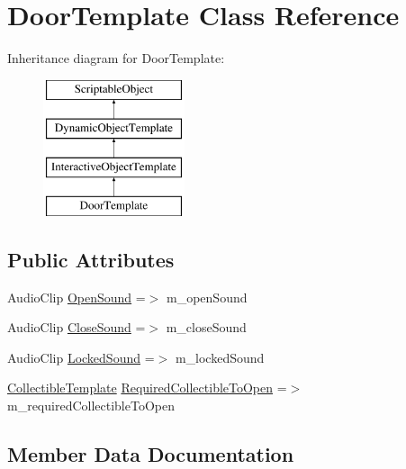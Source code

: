 \hypertarget{class_door_template}{}\section{Door\+Template Class Reference}
\label{class_door_template}
Inheritance diagram for Door\+Template\+:\begin{figure}[H]
\begin{center}
\leavevmode
\includegraphics[height=4.000000cm]{class_door_template}
\end{center}
\end{figure}
\subsection*{Public Attributes}
\begin{DoxyCompactItemize}
\item 
Audio\+Clip \mbox{\hyperlink{class_door_template_a0e5d35a1fd060d6b7708f4073b7c25b7}{Open\+Sound}} =$>$ m\+\_\+open\+Sound
\item 
Audio\+Clip \mbox{\hyperlink{class_door_template_a7eb59a7c04e421e21296eda3d99d06cb}{Close\+Sound}} =$>$ m\+\_\+close\+Sound
\item 
Audio\+Clip \mbox{\hyperlink{class_door_template_a37860f0a0b18b910ac5b9521847d67b7}{Locked\+Sound}} =$>$ m\+\_\+locked\+Sound
\item 
\mbox{\hyperlink{class_collectible_template}{Collectible\+Template}} \mbox{\hyperlink{class_door_template_a9d890cc94e93d64b7ebffc3074cf9dc4}{Required\+Collectible\+To\+Open}} =$>$ m\+\_\+required\+Collectible\+To\+Open
\end{DoxyCompactItemize}


\subsection{Member Data Documentation}
\mbox{\label{class_door_template_a7eb59a7c04e421e21296eda3d99d06cb}} 
